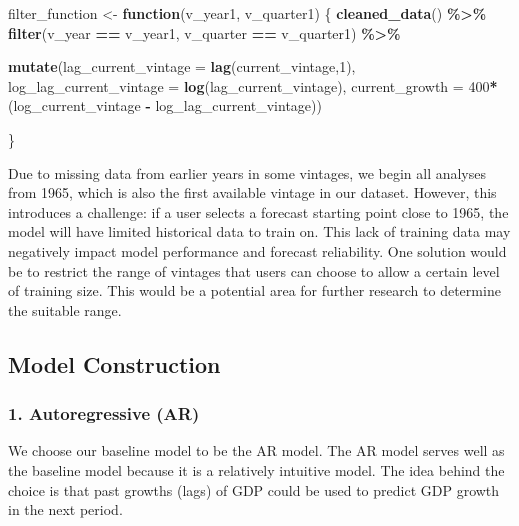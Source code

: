 \documentclass[
]{article}
\newenvironment{Shaded}{\begin{snugshade}}{\end{snugshade}}
\newcommand{\AttributeTok}[1]{\textcolor[rgb]{0.13,0.29,0.53}{#1}}
\newcommand{\ControlFlowTok}[1]{\textcolor[rgb]{0.13,0.29,0.53}{\textbf{#1}}}
\newcommand{\DecValTok}[1]{\textcolor[rgb]{0.00,0.00,0.81}{#1}}
\newcommand{\FunctionTok}[1]{\textcolor[rgb]{0.13,0.29,0.53}{\textbf{#1}}}
\newcommand{\NormalTok}[1]{#1}
\newcommand{\OtherTok}[1]{\textcolor[rgb]{0.56,0.35,0.01}{#1}}
\newcommand{\SpecialCharTok}[1]{\textcolor[rgb]{0.81,0.36,0.00}{\textbf{#1}}}
\begin{document}
\begin{Shaded}
\begin{Highlighting}[]
\NormalTok{filter\_function }\OtherTok{\textless{}{-}} \ControlFlowTok{function}\NormalTok{(v\_year1, v\_quarter1) \{}
    \FunctionTok{cleaned\_data}\NormalTok{() }\SpecialCharTok{\%\textgreater{}\%} \FunctionTok{filter}\NormalTok{(v\_year }\SpecialCharTok{==}\NormalTok{ v\_year1,}
\NormalTok{                              v\_quarter }\SpecialCharTok{==}\NormalTok{ v\_quarter1) }\SpecialCharTok{\%\textgreater{}\%}
      
      \FunctionTok{mutate}\NormalTok{(}\AttributeTok{lag\_current\_vintage =} \FunctionTok{lag}\NormalTok{(current\_vintage,}\DecValTok{1}\NormalTok{),}
             \AttributeTok{log\_lag\_current\_vintage =} \FunctionTok{log}\NormalTok{(lag\_current\_vintage),}
             \AttributeTok{current\_growth =} \DecValTok{400}\SpecialCharTok{*}\NormalTok{(log\_current\_vintage }\SpecialCharTok{{-}}\NormalTok{ log\_lag\_current\_vintage))}
    
\NormalTok{  \}}
\end{Highlighting}
\end{Shaded}

Due to missing data from earlier years in some vintages, we begin all
analyses from 1965, which is also the first available vintage in our
dataset. However, this introduces a challenge: if a user selects a
forecast starting point close to 1965, the model will have limited
historical data to train on. This lack of training data may negatively
impact model performance and forecast reliability. One solution would be
to restrict the range of vintages that users can choose to allow a
certain level of training size. This would be a potential area for
further research to determine the suitable range.

\hypertarget{model-construction}{%
\subsection{Model Construction}\label{model-construction}}

\hypertarget{autoregressive-ar}{%
\subsubsection{1. Autoregressive (AR)}\label{autoregressive-ar}}

We choose our baseline model to be the AR model. The AR model serves
well as the baseline model because it is a relatively intuitive model.
The idea behind the choice is that past growths (lags) of GDP could be
used to predict GDP growth in the next period.
\end{document}
